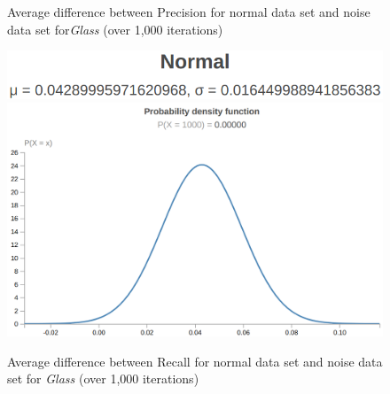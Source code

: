\documentclass[twoside,11pt]{article}
\begin{document}
\begin{figure}[!hbp]
\begin{minipage}[b]{0.3\textwidth}
        \caption{Average difference between Precision for normal data set and noise data set for\emph{Glass} (over 1,000 iterations)}
    \end{minipage}
    \hfill
    \begin{minipage}[b]{0.3\textwidth}
        \includegraphics[width=\textwidth]{g-r-ms.png}
        \includegraphics[width=\textwidth]{g-r-ds.png}
        \caption{Average difference between Recall for normal data set and noise data set for \emph{Glass} (over 1,000 iterations)}
    \end{minipage}
\end{figure}
\end{document}
